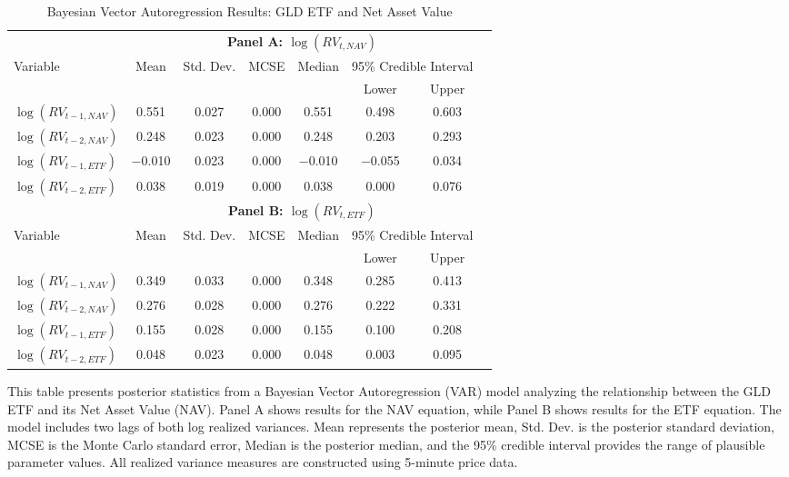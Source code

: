 \begin{landscape}
\begin{table}[htbp]
\centering
\caption{Bayesian Vector Autoregression Results: GLD ETF and Net Asset Value}
\label{tab:VAR_GLD}
\begin{threeparttable}
\footnotesize
\begin{tabular}{@{}lccccccc@{}}
\toprule
 & \multicolumn{6}{c}{\textbf{Panel A: $\log(RV_{t,NAV})$}} \\
\cmidrule(lr){2-7}
Variable & Mean & Std. Dev. & MCSE & Median & \multicolumn{2}{c}{95\% Credible Interval} \\
\cmidrule(lr){6-7}
 &  &  &  &  & Lower & Upper \\
\midrule
$\log(RV_{t-1,NAV})$ & 0.551 & 0.027 & 0.000 & 0.551 & 0.498 & 0.603 \\
$\log(RV_{t-2,NAV})$ & 0.248 & 0.023 & 0.000 & 0.248 & 0.203 & 0.293 \\
$\log(RV_{t-1,ETF})$ & $-$0.010 & 0.023 & 0.000 & $-$0.010 & $-$0.055 & 0.034 \\
$\log(RV_{t-2,ETF})$ & 0.038 & 0.019 & 0.000 & 0.038 & 0.000 & 0.076 \\
\addlinespace[0.3cm]

 & \multicolumn{6}{c}{\textbf{Panel B: $\log(RV_{t,ETF})$}} \\
\cmidrule(lr){2-7}
Variable & Mean & Std. Dev. & MCSE & Median & \multicolumn{2}{c}{95\% Credible Interval} \\
\cmidrule(lr){6-7}
 &  &  &  &  & Lower & Upper \\
\midrule
$\log(RV_{t-1,NAV})$ & 0.349 & 0.033 & 0.000 & 0.348 & 0.285 & 0.413 \\
$\log(RV_{t-2,NAV})$ & 0.276 & 0.028 & 0.000 & 0.276 & 0.222 & 0.331 \\
$\log(RV_{t-1,ETF})$ & 0.155 & 0.028 & 0.000 & 0.155 & 0.100 & 0.208 \\
$\log(RV_{t-2,ETF})$ & 0.048 & 0.023 & 0.000 & 0.048 & 0.003 & 0.095 \\
\bottomrule
\end{tabular}
\begin{tablenotes}
\small
\item This table presents posterior statistics from a Bayesian Vector Autoregression (VAR) model analyzing the relationship between the GLD ETF and its Net Asset Value (NAV). Panel A shows results for the NAV equation, while Panel B shows results for the ETF equation. The model includes two lags of both log realized variances. Mean represents the posterior mean, Std. Dev. is the posterior standard deviation, MCSE is the Monte Carlo standard error, Median is the posterior median, and the 95\% credible interval provides the range of plausible parameter values. All realized variance measures are constructed using 5-minute price data.
\end{tablenotes}
\end{threeparttable}
\end{table}
\end{landscape}

